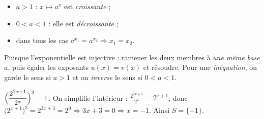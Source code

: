 \documentclass[11pt,a4paper]{article}
\newcommand{\ds}{\displaystyle}
\begin{document}
\begin{minipage}{0.52\textwidth}
\begin{cle}
\begin{itemize}[leftmargin=1.4em,topsep=1pt,itemsep=1pt]
  \item $a>1$ : $x\mapsto a^{x}$ est \emph{croissante} ;
  \item $0<a<1$ : elle est \emph{décroissante} ;
  \item dans tous les cas $a^{x_1}=a^{x_2}\Rightarrow x_1=x_2$.
\end{itemize}
\end{cle}
\end{minipage}\hfill
\begin{minipage}{0.44\textwidth}
\centering
{}
\end{minipage}

\begin{methode}[résoudre une équation exponentielle $a^{u(x)}=a^{v(x)}$]
Puisque l'exponentielle est injective : ramener les deux membres à \emph{une même base} $a$, puis
égaler les exposants $u(x)=v(x)$ et résoudre. Pour une \emph{inéquation}, on garde le sens si $a>1$ et
on \emph{inverse} le sens si $0<a<1$.
\end{methode}

\begin{exemplebox}
$\ds\Bigl(\frac{2^{2x+1}}{2^{x}}\Bigr)^{3}=1$. On simplifie l'intérieur : $\frac{2^{2x+1}}{2^{x}}=2^{x+1}$,
donc $\bigl(2^{x+1}\bigr)^{3}=2^{3x+3}=2^{0}\Rightarrow 3x+3=0\Rightarrow x=-1$. Ainsi $S=\{-1\}$.
\end{exemplebox}
\end{document}
